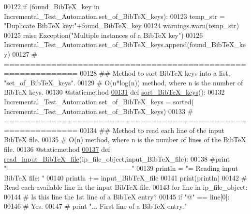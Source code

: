 \begin{DoxyCode}
00122         \textcolor{keywordflow}{if} (found\_BibTeX\_key \textcolor{keywordflow}{in} Incremental\_Test\_Automation.set\_of\_BibTeX\_keys):
00123             temp\_str = \textcolor{stringliteral}{"Duplicate BibTeX key:"}+found\_BibTeX\_key
00124             warnings.warn(temp\_str)
00125             \textcolor{keywordflow}{raise} Exception(\textcolor{stringliteral}{"Multiple instances of a BibTeX key"})
00126         Incremental\_Test\_Automation.set\_of\_BibTeX\_keys.append(found\_BibTeX\_key)
00127     \textcolor{comment}{# ============================================================}
00128     \textcolor{comment}{##  Method to sort BibTeX keys into a list, "set\_of\_BibTeX\_keys".}
00129     \textcolor{comment}{#   O(n*log(n)) method, where n is the number of BibTeX keys.}
00130     @staticmethod
\hypertarget{incremental__test_8py_source_l00131}{}\hyperlink{classincremental__test_1_1Incremental__Test__Automation_a856c60714b5d716d5eb630cbc3d55d09}{00131}     \textcolor{keyword}{def }\hyperlink{classincremental__test_1_1Incremental__Test__Automation_a856c60714b5d716d5eb630cbc3d55d09}{sort\_BibTeX\_keys}():
00132         Incremental\_Test\_Automation.set\_of\_BibTeX\_keys = sorted(
      Incremental\_Test\_Automation.set\_of\_BibTeX\_keys)
00133     \textcolor{comment}{# ============================================================}
00134     \textcolor{comment}{##  Method to read each line of the input BibTeX file.}
00135     \textcolor{comment}{#   O(n) method, where n is the number of lines of the BibTeX file.}
00136     @staticmethod
\hypertarget{incremental__test_8py_source_l00137}{}\hyperlink{classincremental__test_1_1Incremental__Test__Automation_a7cec6a541c4680c857a699dbe363ffbd}{00137}     \textcolor{keyword}{def }\hyperlink{classincremental__test_1_1Incremental__Test__Automation_a7cec6a541c4680c857a699dbe363ffbd}{read\_input\_BibTeX\_file}(ip\_file\_object,input\_BibTeX\_file):
00138         \textcolor{comment}{#print "--------------------------------------------------------"}
00139         println = \textcolor{stringliteral}{"=    Reading input BibTeX file: "}
00140         println += input\_BibTeX\_file
00141         print(println)
00142         \textcolor{comment}{# Read each available line in the input BibTeX file.}
00143         \textcolor{keywordflow}{for} line \textcolor{keywordflow}{in} ip\_file\_object:
00144             \textcolor{comment}{# Is this line the 1st line of a BibTeX entry?}
00145             \textcolor{keywordflow}{if} \textcolor{stringliteral}{"@"} == line[0]:
00146                 \textcolor{comment}{# Yes.}
00147 \textcolor{comment}{#               print "...  First line of a BibTeX entry."}

\end{DoxyCode}
